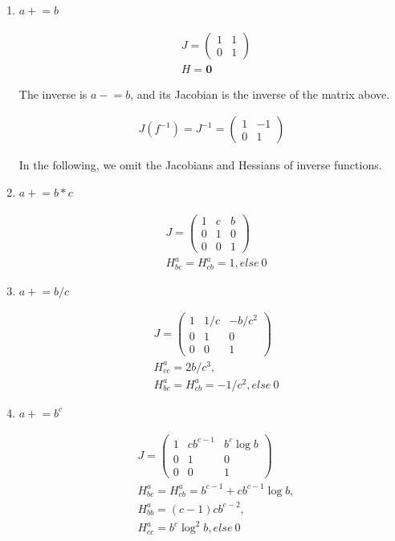 \documentclass[aps,twocolumn,longbibliography,english,superscriptaddress]{revtex4-1}
\newcommand{\<}{\langle}
\renewcommand{\>}{\rangle}
\theoremstyle{definition}\newtheorem{definition}{\textit{Definition}}
\begin{document}
\begin{enumerate}
    \item $a \mathrel+= b$

\begin{align*}
    &J = \left(\begin{matrix}
1 & 1\\
0 & 1
\end{matrix}\right)\\
    &H = \mathbf{0}
\end{align*}

The inverse is $a \mathrel-= b$, and its Jacobian is the inverse of the matrix above.

\begin{align*}
J(f^{-1}) = J^{-1} = \left(\begin{matrix}
1 & -1\\
0 & 1
\end{matrix}\right)
\end{align*}

In the following, we omit the Jacobians and Hessians of inverse functions.

\item $a\mathrel+=b*c$

\begin{align*}
    &J = \left(\begin{matrix}
1 & c & b\\
0 & 1 & 0\\
0 & 0 & 1
\end{matrix}\right)\\
    &H^a_{bc} = H^a_{cb} = 1, else ~0
\end{align*}

\item $a\mathrel+=b/c$

\begin{align*}
    &J = \left(\begin{matrix}
1 & 1/c &-b/c^2\\
0 & 1 & 0\\
0 & 0 & 1
\end{matrix}\right)\\
    &H^a_{cc} = 2b/c^3,\\
    &H^a_{bc} = H^a_{cb} = -1/c^2, else ~ 0
\end{align*}

\item $a\mathrel+=b^c$


\begin{align*}
    &J = \left(\begin{matrix}
1 &  cb^{c-1} &   b^c \log b \\
0 & 1 & 0\\
0 & 0 & 1
\end{matrix}\right)\\
    &H^a_{bc} = H^a_{cb} = b^{c-1} + c b^{c-1}\log b,\\
    &H^a_{bb} = (c-1)c b^{c-2},\\
    &H^a_{cc} = b^c\log^2b, else ~0
\end{align*}


\end{enumerate}
\end{document}
